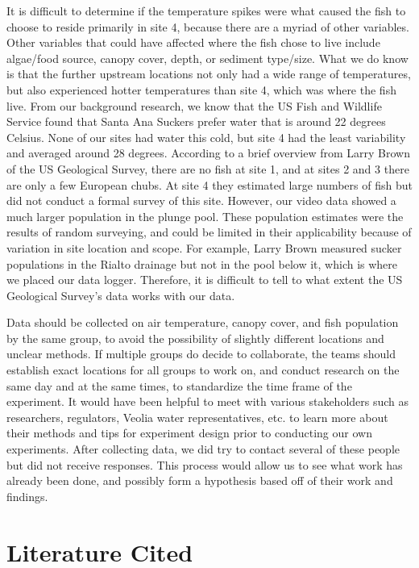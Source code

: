 \documentclass{article}\usepackage[]{graphicx}\usepackage[]{color}
\begin{document}
It is difficult to determine if the temperature spikes were what caused the fish to choose to reside primarily in site 4, because there are a myriad of other variables. Other variables that could have affected where the fish chose to live include algae/food source, canopy cover, depth, or sediment type/size. What we do know is that the further upstream locations not only had a wide range of temperatures, but also experienced hotter temperatures than site 4, which was where the fish live. From our background research, we know that the US Fish and Wildlife Service found that Santa Ana Suckers prefer water that is around 22 degrees Celsius. None of our sites had water this cold, but site 4 had the least variability and averaged around 28 degrees. According to a brief overview from Larry Brown of the US Geological Survey, there are no fish at site 1, and at sites 2 and 3 there are only a few European chubs. At site 4 they estimated large numbers of fish but did not conduct a formal survey of this site. However, our video data showed a much larger population in the plunge pool. These population estimates were the results of random surveying, and could be limited in their applicability because of variation in site location and scope. For example, Larry Brown measured sucker populations in the Rialto drainage but not in the pool below it, which is where we placed our data logger. Therefore, it is difficult to tell to what extent the US Geological Survey’s data works with our data. 

Data should be collected on air temperature, canopy cover, and fish population by the same group, to avoid the possibility of slightly different locations and unclear methods. If multiple groups do decide to collaborate, the teams should establish exact locations for all groups to work on, and conduct research on the same day and at the same times, to standardize the time frame of the experiment. It would have been helpful to meet with various stakeholders such as researchers, regulators, Veolia water representatives, etc. to learn more about their methods and tips for experiment design prior to conducting our own experiments. After collecting data, we did try to contact several of these people but did not receive responses. This process would allow us to see what work has already been done, and possibly form a hypothesis based off of their work and findings.

\section{Literature Cited}
\end{document}
